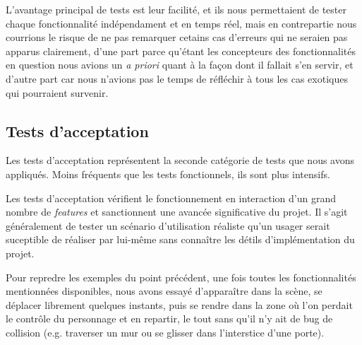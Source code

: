 L'avantage principal de tests est leur facilité, et ils nous permettaient de tester chaque fonctionnalité indépendament et en temps réel, mais en contrepartie nous courrions le risque de ne pas remarquer cetains cas d'erreurs qui ne seraien pas apparus clairement, d'une part parce qu'étant les concepteurs des fonctionnalités en question nous avions un \textit{a priori} quant à la façon dont il fallait s'en servir, et d'autre part car nous n'avions pas le temps de réfléchir à tous les cas exotiques qui pourraient survenir. 

\subsection{Tests d'acceptation}

Les tests d'acceptation représentent la seconde catégorie de tests que nous avons appliqués. Moins fréquents que les tests fonctionnels, ils sont plus intensifs. \newline

Les tests d'acceptation vérifient le fonctionnement en interaction d'un grand nombre de \textit{features} et sanctionnent une avancée significative du projet. Il s'agit généralement de tester un scénario d'utilisation réaliste qu'un usager serait suceptible de réaliser par lui-même sans connaître les détils d'implémentation du projet. \newline

Pour repredre les exemples du point précédent, une fois toutes les fonctionnalités mentionnées disponibles, nous avons essayé d'apparaître dans la scène, se déplacer librement quelques instants, puis se rendre dans la zone où l'on perdait le contrôle du personnage et en repartir, le tout sans qu'il n'y ait de bug de collision (e.g. traverser un mur ou se glisser dans l'interstice d'une porte). 